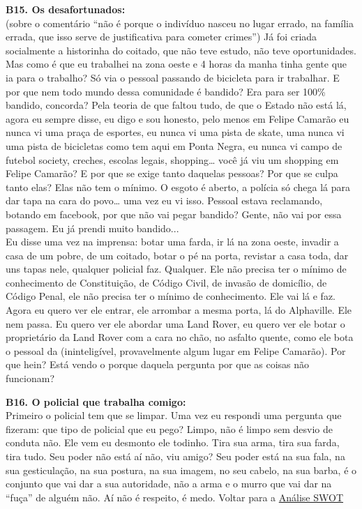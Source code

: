 \documentclass[
	12pt,				%
	openright,			%
	twoside,			%
	a4paper,			%
	chapter=TITLE,		%
	section=TITLE,		%
	subsection=TITLE,	%
	subsubsection=TITLE,%
	spanish,            %
	english,			%
	brazil				%
	]{abntex2}
\begin{document}
\begin{anexosenv}
	\hypertarget{B15}{}
	\par
	\textbf{B15. Os desafortunados:}\\ 
	(sobre o comentário “não é porque o indivíduo nasceu no lugar errado, na família errada, que isso serve de justificativa para cometer crimes”) Já foi criada socialmente a historinha do coitado, que não teve estudo, não teve oportunidades. Mas como é que eu trabalhei na zona oeste e 4 horas da manha tinha gente que ia para o trabalho? Só via o pessoal passando de bicicleta para ir trabalhar. E por que nem todo mundo dessa comunidade é bandido? Era para ser 100\% bandido, concorda? Pela teoria de que faltou tudo, de que o Estado não está lá, agora eu sempre disse, eu digo e sou honesto, pelo menos em Felipe Camarão eu nunca vi uma praça de esportes, eu nunca vi uma pista de skate, uma nunca vi uma pista de bicicletas como tem aqui em Ponta Negra, eu nunca vi campo de futebol society, creches, escolas legais, shopping… você já viu um shopping em Felipe Camarão? E por que se exige tanto daquelas pessoas? Por que se culpa tanto elas? Elas não tem o mínimo. O esgoto é aberto, a polícia só chega lá para dar tapa na cara do povo… uma vez eu vi isso. Pessoal estava reclamando, botando em facebook, por que não vai pegar bandido? Gente, não vai por essa passagem. Eu já prendi muito bandido... \hypertarget{B15A}{} \\
	Eu disse uma vez na imprensa: botar uma farda, ir lá na zona oeste, invadir a casa de um pobre, de um coitado, botar o pé na porta, revistar a casa toda, dar uns tapas nele, qualquer policial faz. Qualquer. Ele não precisa ter o mínimo de conhecimento de Constituição, de Código Civil, de invasão de domicílio, de Código Penal, ele não precisa ter o mínimo de conhecimento. Ele vai lá e faz. Agora eu quero ver ele entrar, ele arrombar a mesma porta, lá do Alphaville. Ele nem passa. Eu quero ver ele abordar uma Land Rover, eu quero ver ele botar o proprietário da Land Rover com a cara no chão, no asfalto quente, como ele bota o pessoal da (ininteligível, provavelmente algum lugar em Felipe Camarão). Por que hein? Está vendo o porque daquela pergunta por que as coisas não funcionam?
	\hypertarget{B16}{}
	\par
	\textbf{B16. O policial que trabalha comigo:}\\
	Primeiro o policial tem que se limpar. Uma vez eu respondi uma pergunta que fizeram: que tipo de policial que eu pego? Limpo, não é limpo sem desvio de conduta não. Ele vem eu desmonto ele todinho. Tira sua arma, tira sua farda, tira tudo. Seu poder não está aí não, viu amigo? Seu poder está na sua fala, na sua gesticulação, na sua postura, na sua imagem, no seu cabelo, na sua barba, é o conjunto que vai dar a sua autoridade, não a arma e o murro que vai dar na “fuça” de alguém não. Aí não é respeito, é medo. Voltar para a \hyperlink{W13}{Análise SWOT}\\
				


\end{anexosenv}
\end{document}
